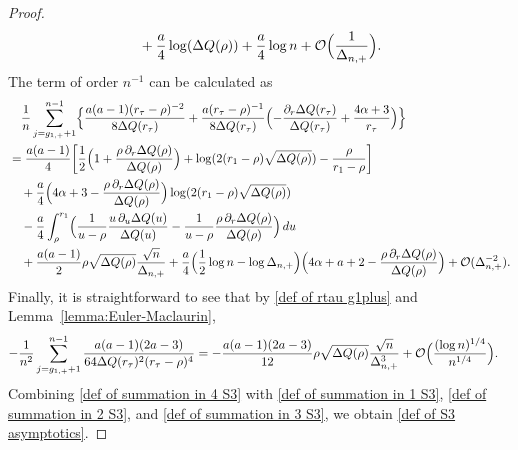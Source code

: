 \documentclass[10pt,a4paper]{amsart}
\begin{document}
\begin{proof}
\begin{align}
\begin{split}
&\quad
+\frac{a}{4}\log(\Delta Q(\rho))
+\frac{a}{4}\log n
+
\mathcal{O}\Bigl( 
\frac{1}{\Delta_{n,+}}
\Bigr). 
\end{split}
\end{align}
The term of order $n^{-1}$ can be calculated as
\begin{align}
\begin{split}
\label{def of summation in 2 S3}
&\quad
\frac{1}{n}
\sum_{j=g_{1,+}+1}^{n-1}
\Bigl\{ 
\frac{a(a-1)(r_{\tau}-\rho)^{-2}}{8\Delta Q(r_{\tau})}
+\frac{a(r_{\tau}-\rho)^{-1}}{8\Delta Q(r_{\tau})}
\Bigl(-\frac{\partial_r\Delta Q(r_{\tau})}{\Delta Q(r_{\tau})}
+\frac{4\alpha+3}{r_{\tau}}
\Bigr)
\Bigr\}
\\
&=
\frac{a(a-1)}{4}\bigg[\frac{1}{2}\Bigl(1+\frac{\rho\,\partial_r\Delta Q(\rho)}{\Delta Q(\rho)}\Bigr)+\log(2(r_1-\rho)\sqrt{\Delta Q(\rho)})-\frac{\rho}{r_1-\rho}\bigg]
\\
&\quad
+\frac{a}{4}\Bigl(4\alpha+3-\frac{\rho\,\partial_r\Delta Q(\rho)}{\Delta Q(\rho)}\Bigr)\log(2(r_1-\rho)\sqrt{\Delta Q(\rho)})
\\
&\quad
-\frac{a}{4}\int_{\rho}^{r_1}\Bigl(\frac{1}{u-\rho}\frac{u\,\partial_u\Delta Q(u)}{\Delta Q(u)}-\frac{1}{u-\rho}\frac{\rho\,\partial_r\Delta Q(\rho)}{\Delta Q(\rho)}\Bigr)\,du
\\
&\quad
+\frac{a(a-1)}{2}\rho\sqrt{\Delta Q(\rho)}\frac{\sqrt{n}}{\Delta_{n,+}}
+\frac{a}{4}\Bigl(\frac{1}{2}\log n-\log\Delta_{n,+}\Bigr)\Bigl(4\alpha+a+2-\frac{\rho\,\partial_r\Delta Q(\rho)}{\Delta Q(\rho)}\Bigr)+\mathcal{O}(\Delta_{n,+}^{-2}). 
\end{split}
\end{align}
Finally, it is straightforward to see that by \eqref{def of rtau g1plus} and Lemma~\ref{lemma:Euler-Maclaurin}, 
\begin{align}
\label{def of summation in 3 S3}
-\frac{1}{n^2}
\sum_{j=g_{1,+}+1}^{n-1}
\frac{a(a-1)(2a-3)}{64\Delta Q(r_{\tau})^2(r_{\tau}-\rho)^4}
&=
-\frac{a(a-1)(2a-3)}{12}\rho\sqrt{\Delta Q(\rho)}\frac{\sqrt{n}}{\Delta_{n,+}^3}
+\mathcal{O}\Bigl(\frac{(\log n)^{1/4}}{n^{1/4}}\Bigr). 
\end{align}
Combining \eqref{def of summation in 4 S3} with \eqref{def of summation in 1 S3}, \eqref{def of summation in 2 S3}, and \eqref{def of summation in 3 S3}, we obtain \eqref{def of S3 asymptotics}.
\end{proof}
\end{document}
